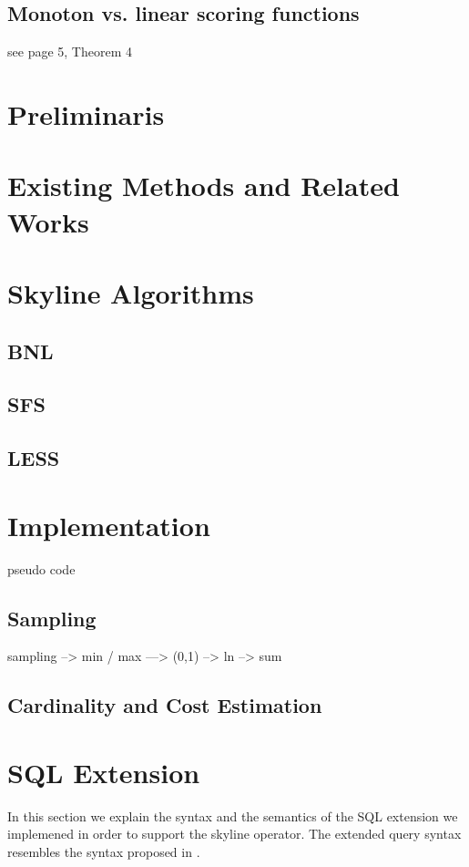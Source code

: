 \subsection{Monoton vs. linear scoring functions}
see \citep{Chomicki2002a} page 5, Theorem 4

\section{Preliminaris}
\section{Existing Methods and Related Works}
\section{Skyline Algorithms}
\subsection{BNL}
\subsection{SFS}
\subsection{LESS}

\section{Implementation}
pseudo code

\subsection{Sampling}

sampling --> min / max  ---> (0,1) --> ln   --> sum

\subsection{Cardinality and Cost Estimation}


\section{SQL Extension}

In this section we explain the syntax and the semantics of the SQL
extension we implemened in order to support the skyline operator. The
extended query syntax resembles the syntax proposed in
\citep{Borzsonyi2001}.

